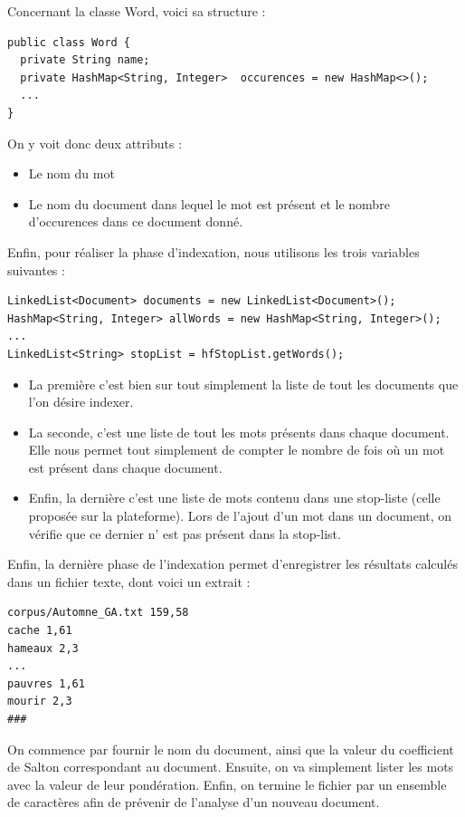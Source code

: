 \documentclass{article}
\begin{document}
Concernant la classe Word, voici sa structure :

\begin{lstlisting}
public class Word {
  private String name;
  private HashMap<String, Integer>  occurences = new HashMap<>();
  ...
}
\end{lstlisting}

On y voit donc deux attributs :
\begin{itemize}
  \item Le nom du mot
  \item Le nom du document dans lequel le mot est présent et le nombre d'occurences dans ce
  document donné.
\end{itemize}

Enfin, pour réaliser la phase d'indexation, nous utilisons les trois variables suivantes :

\begin{lstlisting}
LinkedList<Document> documents = new LinkedList<Document>();
HashMap<String, Integer> allWords = new HashMap<String, Integer>();
...
LinkedList<String> stopList = hfStopList.getWords();
\end{lstlisting}

\begin{itemize}
  \item La première c'est bien sur tout simplement la liste de tout les documents que l'on
  désire indexer.
  \item La seconde, c'est une liste de tout les mots présents dans chaque document. Elle nous
  permet tout simplement de compter le nombre de fois où un mot est présent dans chaque
  document.
  \item Enfin, la dernière c'est une liste de mots contenu dans une stop-liste (celle proposée
  sur la plateforme). Lors de l'ajout d'un mot dans un document, on vérifie que ce dernier n'
  est pas présent dans la stop-list.
\end{itemize}

Enfin, la dernière phase de l'indexation permet d'enregistrer les résultats calculés dans un
fichier texte, dont voici un extrait :

\begin{lstlisting}
corpus/Automne_GA.txt 159,58
cache 1,61
hameaux 2,3
...
pauvres 1,61
mourir 2,3
###
\end{lstlisting}

On commence par fournir le nom du document, ainsi que la valeur du coefficient de Salton
correspondant au document. Ensuite, on va simplement lister les mots avec la valeur de leur
pondération. Enfin, on termine le fichier par un ensemble de caractères afin de prévenir de
l'analyse d'un nouveau document.
\end{document}
